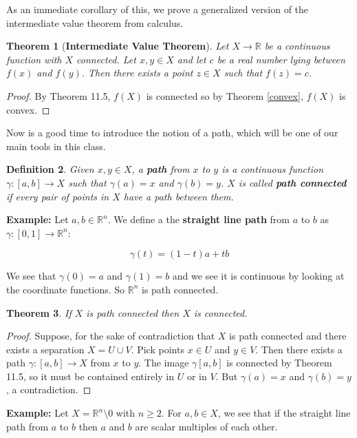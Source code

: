 \documentclass[a4paper]{article}
\newtheorem{theorem}{Theorem}
\newtheorem{definition}[theorem]{Definition}
\numberwithin{theorem}{section}
\begin{document}
As an immediate corollary of this, we prove a generalized version of the intermediate value theorem from calculus. 

\begin{theorem}[\textbf{Intermediate Value Theorem}]
Let $X \rightarrow \mathbb{R}$ be a continuous function with $X$ connected. Let $x,y \in X$ and let $c$ be a real number lying between $f(x)$ and $f(y)$. Then there exists a point $z \in X$ such that $f(z) = c$.
\end{theorem}

\begin{proof}
By Theorem 11.5, $f(X)$ is connected so by Theorem \ref{convex}, $f(X)$ is convex.
\end{proof}

Now is a good time to introduce the notion of a path, which will be one of our main tools in this class.

\begin{definition}
Given $x,y \in X$, a \textbf{path} from $x$ to $y$ is a continuous function $\gamma: [a,b] \rightarrow X$ such that $\gamma(a) = x$ and $\gamma(b) = y$. $X$ is called \textbf{path connected} if every pair of points in $X$ have a path between them.
\end{definition}

\textbf{Example:} Let $a,b \in \mathbb{R}^n$. We define a the \textbf{straight line path} from $a$ to $b$ as $\gamma: [0,1] \rightarrow \mathbb{R}^n$:

$$ \gamma(t) = (1-t)a + tb $$

We see that $\gamma(0) = a$ and $\gamma(1) = b$ and we see it is continuous by looking at the coordinate functions. So $\mathbb{R}^n$ is path connected.

\begin{theorem}
If $X$ is path connected then $X$ is connected.
\end{theorem}
\begin{proof}
Suppose, for the sake of contradiction that $X$ is path connected and there exists a separation $X = U \cup V$. Pick points $x \in U$ and $y \in V$. Then there exists a path $\gamma: [a,b] \rightarrow X$ from $x$ to $y$. The image $\gamma[a,b]$ is connected by Theorem 11.5, so it must be contained entirely in $U$ or in $V$. But $\gamma(a) = x$ and $\gamma(b) = y$, a contradiction.
\end{proof}

\textbf{Example:} Let $X = \mathbb{R}^n \setminus 0$ with $n \geq 2$. For $a,b \in X$, we see that if the straight line path from $a$ to $b$ then $a$ and $b$ are scalar multiples of each other.
\end{document}
